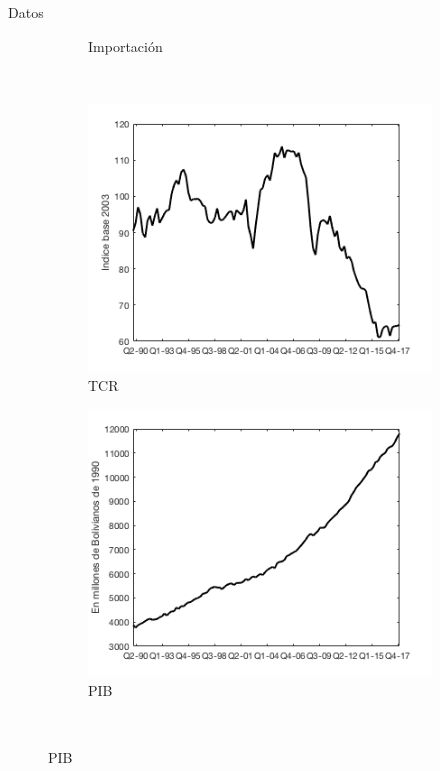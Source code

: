\documentclass{beamer}
\begin{document}
\begin{frame}{Datos}
\begin{figure}
\begin{subfigure}[b]{0.31\textwidth}
        \caption{Importación}
    \end{subfigure}
    ~ %
    \begin{subfigure}[b]{0.31\textwidth}
        \includegraphics[width=\textwidth]{12tcr}
        \caption{TCR}
    \end{subfigure}
    \begin{subfigure}[b]{0.31\textwidth}
        \includegraphics[width=\textwidth]{13pib}
        \caption{PIB}
    \end{subfigure}
    ~ %

\end{figure}
\end{frame}
\end{document}
